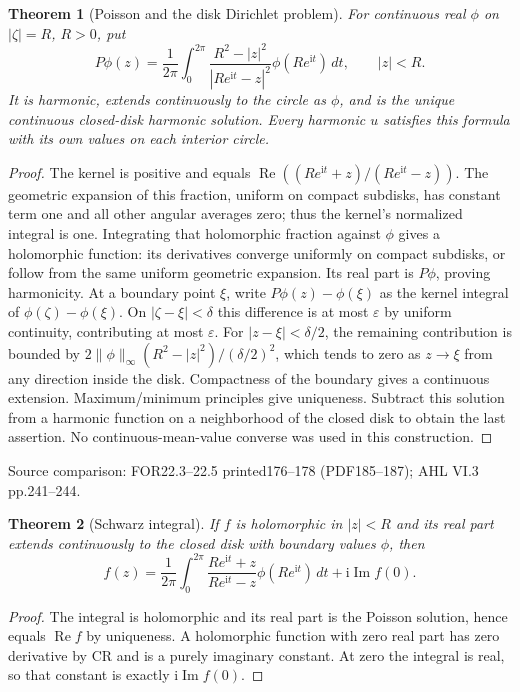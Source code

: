 \documentclass[11pt,a4paper,openany]{book}
\newtheorem{theorem}{Theorem}[chapter]
\theoremstyle{definition}
\theoremstyle{remark}\newtheorem{remark}[theorem]{Remark}
\newcommand{\eps}{\varepsilon}\newcommand{\ee}{\varepsilon}
\newcommand{\dd}{\,d}\newcommand{\iu}{\mathrm i}
\DeclareMathOperator{\Ree}{Re}\DeclareMathOperator{\Imm}{Im}
\newcommand{\family}[1]{}
\newcommand{\source}[1]{\par\begingroup\small\sffamily\color{black!65}Source comparison: #1\par\endgroup}
\begin{document}
\begin{theorem}[Poisson and the disk Dirichlet problem]\family{D12.13.04}\label{d12:13-04}
For continuous real $\phi$ on $|\zeta|=R$, $R>0$, put
\[
 P\phi(z)=\frac1{2\pi}\int_0^{2\pi}
 \frac{R^2-|z|^2}{|Re^{\iu t}-z|^2}\phi(Re^{\iu t})\dd t,
 \qquad |z|<R.
\]
It is harmonic, extends continuously to the circle as $\phi$, and is the unique continuous closed-disk harmonic solution. Every harmonic $u$ satisfies this formula with its own values on each interior circle.
\end{theorem}
\begin{proof}
The kernel is positive and equals $\Ree((Re^{\iu t}+z)/(Re^{\iu t}-z))$. The geometric expansion of this fraction, uniform on compact subdisks, has constant term one and all other angular averages zero; thus the kernel's normalized integral is one. Integrating that holomorphic fraction against $\phi$ gives a holomorphic function: its derivatives converge uniformly on compact subdisks, or follow from the same uniform geometric expansion. Its real part is $P\phi$, proving harmonicity.
At a boundary point $\xi$, write $P\phi(z)-\phi(\xi)$ as the kernel integral of $\phi(\zeta)-\phi(\xi)$. On $|\zeta-\xi|<\delta$ this difference is at most $\eps$ by uniform continuity, contributing at most $\eps$. For $|z-\xi|<\delta/2$, the remaining contribution is bounded by $2\|\phi\|_\infty(R^2-|z|^2)/(\delta/2)^2$, which tends to zero as $z\to\xi$ from any direction inside the disk. Compactness of the boundary gives a continuous extension. Maximum/minimum principles give uniqueness. Subtract this solution from a harmonic function on a neighborhood of the closed disk to obtain the last assertion. No continuous-mean-value converse was used in this construction.
\end{proof}
\source{FOR22.3--22.5 printed176--178 (PDF185--187); AHL VI.3 pp.241--244.}

\begin{theorem}[Schwarz integral]\family{D12.13.05}\label{d12:13-05}
If $f$ is holomorphic in $|z|<R$ and its real part extends continuously to the closed disk with boundary values $\phi$, then
\[
 f(z)=\frac1{2\pi}\int_0^{2\pi}
 \frac{Re^{\iu t}+z}{Re^{\iu t}-z}\phi(Re^{\iu t})\dd t
 +\iu\Imm f(0).
\]
\end{theorem}
\begin{proof}
The integral is holomorphic and its real part is the Poisson solution, hence equals $\Ree f$ by uniqueness. A holomorphic function with zero real part has zero derivative by CR and is a purely imaginary constant. At zero the integral is real, so that constant is exactly $\iu\Imm f(0)$.
\end{proof}
\end{document}
